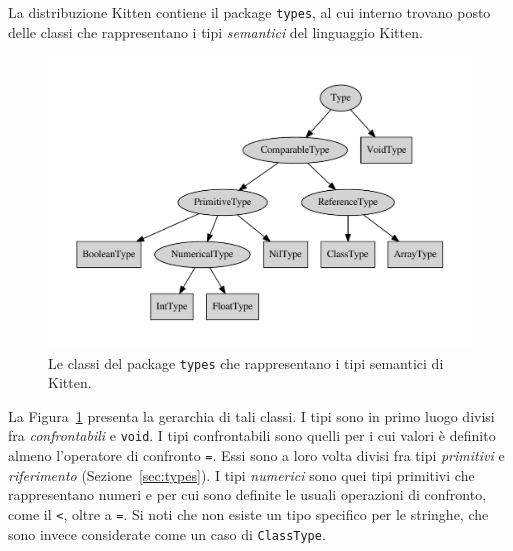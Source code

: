 La distribuzione Kitten contiene il package \texttt{types}, al cui interno
trovano posto delle classi che rappresentano i tipi \emph{semantici}
del linguaggio Kitten.
%
\begin{figure}
\begin{center}
\includegraphics[width=12cm]{semantical_types.pdf}
\end{center}
\caption{Le classi del package \texttt{types} che rappresentano i tipi semantici di Kitten.}\label{fig:semantical_types}
\end{figure}
%
La Figura~\ref{fig:semantical_types} presenta la gerarchia di tali classi.
I tipi sono in primo luogo divisi fra \emph{confrontabili} e \texttt{void}.
I tipi confrontabili sono quelli per i cui valori \`e definito almeno
l'operatore di confronto \texttt{=}. Essi sono a loro volta divisi fra
tipi \emph{primitivi} e \emph{riferimento} (Sezione~\ref{sec:types}). I tipi
\emph{numerici} sono quei tipi primitivi che rappresentano numeri e per
cui sono definite le usuali operazioni di confronto, come il \texttt{<},
oltre a \texttt{=}.
Si noti che non esiste un tipo specifico per le stringhe, che sono invece
considerate come un caso di \texttt{ClassType}.

